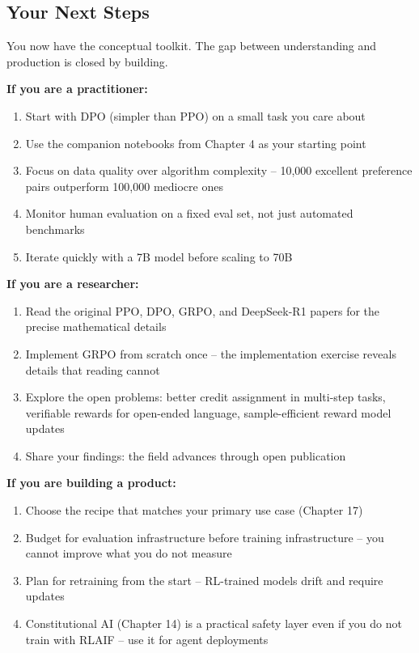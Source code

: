 \begin{chapterenv}
\section{Your Next Steps}

You now have the conceptual toolkit. The gap between understanding and production is closed by building.

\textbf{If you are a practitioner:}
\begin{enumerate}
\item Start with DPO (simpler than PPO) on a small task you care about
\item Use the companion notebooks from Chapter 4 as your starting point
\item Focus on data quality over algorithm complexity -- 10,000 excellent preference pairs outperform 100,000 mediocre ones
\item Monitor human evaluation on a fixed eval set, not just automated benchmarks
\item Iterate quickly with a 7B model before scaling to 70B
\end{enumerate}

\textbf{If you are a researcher:}
\begin{enumerate}
\item Read the original PPO, DPO, GRPO, and DeepSeek-R1 papers for the precise mathematical details
\item Implement GRPO from scratch once -- the implementation exercise reveals details that reading cannot
\item Explore the open problems: better credit assignment in multi-step tasks, verifiable rewards for open-ended language, sample-efficient reward model updates
\item Share your findings: the field advances through open publication
\end{enumerate}

\textbf{If you are building a product:}
\begin{enumerate}
\item Choose the recipe that matches your primary use case (Chapter 17)
\item Budget for evaluation infrastructure before training infrastructure -- you cannot improve what you do not measure
\item Plan for retraining from the start -- RL-trained models drift and require updates
\item Constitutional AI (Chapter 14) is a practical safety layer even if you do not train with RLAIF -- use it for agent deployments
\end{enumerate}


\end{chapterenv}
